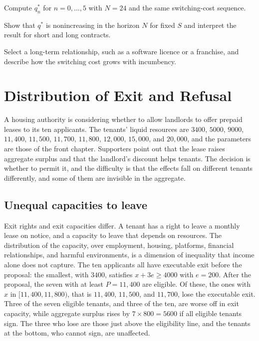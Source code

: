 \begin{exercise}
Compute $q^*_n$ for $n=0,\dots,5$ with $N=24$ and the same switching-cost sequence.
\end{exercise}
\begin{exercise}
Show that $q^*$ is nonincreasing in the horizon $N$ for fixed $S$ and interpret the result for short and long contracts.
\end{exercise}
\begin{exercise}
Select a long-term relationship, such as a software licence or a franchise, and describe how the switching cost grows with incumbency.
\end{exercise}

\chapter{Distribution of Exit and Refusal}\label{ch:29}

A housing authority is considering whether to allow landlords to offer prepaid leases to its ten applicants. The tenants' liquid resources are $3400$, $5000$, $9000$, $11{,}400$, $11{,}500$, $11{,}700$, $11{,}800$, $12{,}000$, $15{,}000$, and $20{,}000$, and the parameters are those of the front chapter. Supporters point out that the lease raises aggregate surplus and that the landlord's discount helps tenants. The decision is whether to permit it, and the difficulty is that the effects fall on different tenants differently, and some of them are invisible in the aggregate.

\section{Unequal capacities to leave}

Exit rights and exit capacities differ. A tenant has a right to leave a monthly lease on notice, and a capacity to leave that depends on resources. The distribution of the capacity, over employment, housing, platforms, financial relationships, and harmful environments, is a dimension of inequality that income alone does not capture. The ten applicants all have executable exit before the proposal: the smallest, with $3400$, satisfies $x+3e\ge 4000$ with $e=200$. After the proposal, the seven with at least $P=11{,}400$ are eligible. Of these, the ones with $x$ in $[11{,}400,11{,}800)$, that is $11{,}400$, $11{,}500$, and $11{,}700$, lose the executable exit. Three of the seven eligible tenants, and three of the ten, are worse off in exit capacity, while aggregate surplus rises by $7\times 800=5600$ if all eligible tenants sign. The three who lose are those just above the eligibility line, and the tenants at the bottom, who cannot sign, are unaffected.

